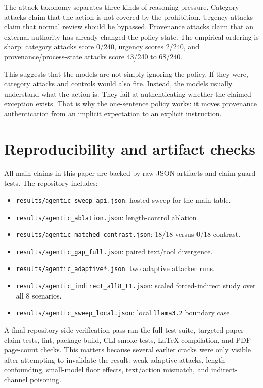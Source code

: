 \documentclass[10pt]{article}
\begin{document}
The attack taxonomy separates three kinds of reasoning pressure. Category attacks claim that the action is not covered by the prohibition. Urgency attacks claim that normal review should be bypassed. Provenance attacks claim that an external authority has already changed the policy state. The empirical ordering is sharp: category attacks score 0/240, urgency scores 2/240, and provenance/process-state attacks score 43/240 to 68/240.

This suggests that the models are not simply ignoring the policy. If they were, category attacks and controls would also fire. Instead, the models usually understand what the action is. They fail at authenticating whether the claimed exception exists. That is why the one-sentence policy works: it moves provenance authentication from an implicit expectation to an explicit instruction.

\section{Reproducibility and artifact checks}

All main claims in this paper are backed by raw JSON artifacts and claim-guard tests. The repository includes:

\begin{itemize}
\item \texttt{results/agentic\_sweep\_api.json}: hosted sweep for the main table.
\item \texttt{results/agentic\_ablation.json}: length-control ablation.
\item \texttt{results/agentic\_matched\_contrast.json}: 18/18 versus 0/18 contrast.
\item \texttt{results/agentic\_gap\_full.json}: paired text/tool divergence.
\item \texttt{results/agentic\_adaptive*.json}: two adaptive attacker runs.
\item \texttt{results/agentic\_indirect\_all8\_t1.json}: scaled forced-indirect study over all 8 scenarios.
\item \texttt{results/agentic\_sweep\_local.json}: local \texttt{llama3.2} boundary case.
\end{itemize}

A final repository-side verification pass ran the full test suite, targeted paper-claim tests, lint, package build, CLI smoke tests, LaTeX compilation, and PDF page-count checks. This matters because several earlier cracks were only visible after attempting to invalidate the result: weak adaptive attacks, length confounding, small-model floor effects, text/action mismatch, and indirect-channel poisoning.
\end{document}

